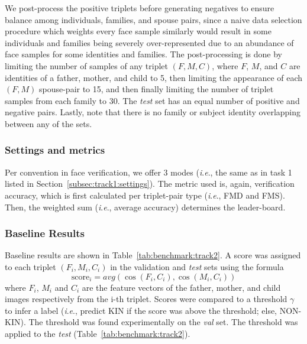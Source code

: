\documentclass[letterpaper, 10 pt, conference]{ieeeconf}
\newcommand{\ie}{\textit{i}.\textit{e}., }
\begin{document}
We post-process the positive triplets before generating negatives to ensure balance among individuals, families, and spouse pairs, since a naive data selection procedure which weights every face sample similarly would result in some individuals and families being severely over-represented due to an abundance of face samples for some identities and families. 
The post-processing is done by limiting the number of samples of any triplet $(F, M, C)$, where $F$, $M$, and $C$ are identities of a father, mother, and child to 5, then limiting the appearance of each $(F, M)$ spouse-pair to 15, and then finally limiting the number of triplet samples from each family to 30. The \emph{test} set has an equal number of positive and negative pairs. Lastly, note that there is no family or subject identity overlapping between any of the sets.
%


\subsubsection{Settings and metrics}
Per convention in face verification, we offer 3 modes (\ie the same as in task 1 listed in Section~\ref{subsec:track1:settings}). The metric used is, again, verification accuracy, which is first calculated per triplet-pair type (\ie FMD and FMS). Then, the weighted sum (\ie average accuracy) determines the leader-board.



\subsubsection{Baseline Results}
Baseline results are shown in Table~\ref{tab:benchmark:track2}. A score was assigned to each triplet $(F_i, M_i, C_i)$ in the validation and \emph{test} sets using the formula $$ \text{score}_{i} =  avg(\cos{(F_i, C_i)}, \cos{(M_i, C_i)}) $$
where $F_i$, $M_i$ and $C_i$ are the feature vectors of the father, mother, and child images respectively from the i-th triplet. 
Scores were compared to a threshold $\gamma$ to infer a label (\ie predict KIN if the score was above the threshold; else, NON-KIN). 
The threshold was found experimentally on the \emph{val} set. The threshold was applied to the \emph{test} (Table~\ref{tab:benchmark:track2}).
\end{document}
